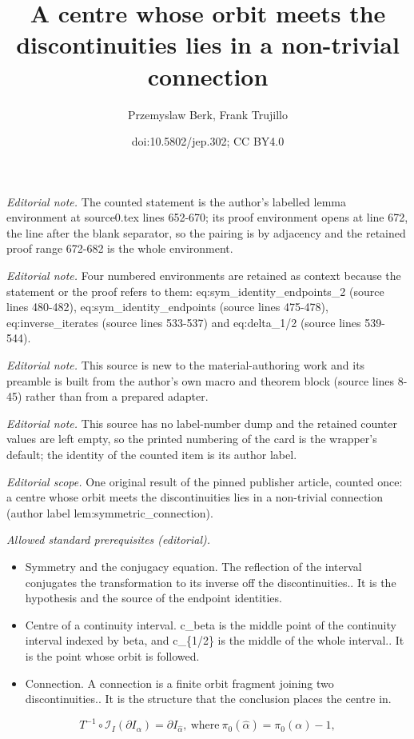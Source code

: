 \documentclass[10pt,a4paper]{article}
\title{A centre whose orbit meets the discontinuities lies in a non-trivial connection}
\author{Przemyslaw Berk, Frank Trujillo}
\date{doi:10.5802/jep.302; CC BY4.0}
\theoremstyle{plain}
\theoremstyle{definition}
\newcommand{\I}{\mathcal{I}}
\begin{document}
\maketitle
\noindent\textit{Editorial note.} The counted statement is the author's labelled lemma environment at source0.tex lines 652-670; its proof environment opens at line 672, the line after the blank separator, so the pairing is by adjacency and the retained proof range 672-682 is the whole environment.\par\medskip
\noindent\textit{Editorial note.} Four numbered environments are retained as context because the statement or the proof refers to them: eq:sym\_identity\_endpoints\_2 (source lines 480-482), eq:sym\_identity\_endpoints (source lines 475-478), eq:inverse\_iterates (source lines 533-537) and eq:delta\_1/2 (source lines 539-544).\par\medskip
\noindent\textit{Editorial note.} This source is new to the material-authoring work and its preamble is built from the author's own macro and theorem block (source lines 8-45) rather than from a prepared adapter.\par\medskip
\noindent\textit{Editorial note.} This source has no label-number dump and the retained counter values are left empty, so the printed numbering of the card is the wrapper's default; the identity of the counted item is its author label.\par\medskip
\noindent\textit{Editorial scope.} One original result of the pinned publisher article, counted once: a centre whose orbit meets the discontinuities lies in a non-trivial connection (author label lem:symmetric\_connection).\par\medskip
\noindent\textit{Allowed standard prerequisites (editorial).}\begin{itemize}
\item Symmetry and the conjugacy equation. The reflection of the interval conjugates the transformation to its inverse off the discontinuities.. It is the hypothesis and the source of the endpoint identities.
\item Centre of a continuity interval. c\_beta is the middle point of the continuity interval indexed by beta, and c\_\{1/2\} is the middle of the whole interval.. It is the point whose orbit is followed.
\item Connection. A connection is a finite orbit fragment joining two discontinuities.. It is the structure that the conclusion places the centre in.
\end{itemize}\medskip
\begin{equation}\label{eq:sym_identity_endpoints_2}
T^{-1}\circ \I_I(\partial I_{\alpha})=\partial I_{\hat\alpha},\ \text{where}\ \pi_0(\hat\alpha)=\pi_0(\alpha)-1,
\end{equation}
\end{document}
